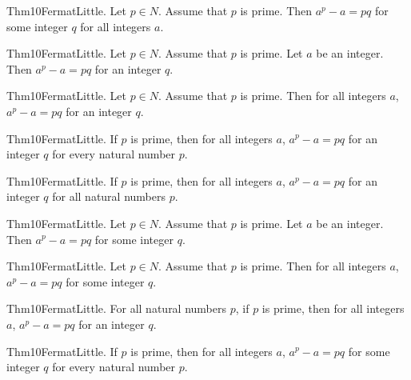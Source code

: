 \documentclass{article}
\begin{document}
Thm10FermatLittle. Let $p \in N$. Assume that $p$ is prime. Then $a ^ {p}- a = p q$ for some integer $q$ for all integers $a$.

Thm10FermatLittle. Let $p \in N$. Assume that $p$ is prime. Let $a$ be an integer. Then $a ^ {p}- a = p q$ for an integer $q$.

Thm10FermatLittle. Let $p \in N$. Assume that $p$ is prime. Then for all integers $a$, $a ^ {p}- a = p q$ for an integer $q$.

Thm10FermatLittle. If $p$ is prime, then for all integers $a$, $a ^ {p}- a = p q$ for an integer $q$ for every natural number $p$.

Thm10FermatLittle. If $p$ is prime, then for all integers $a$, $a ^ {p}- a = p q$ for an integer $q$ for all natural numbers $p$.

Thm10FermatLittle. Let $p \in N$. Assume that $p$ is prime. Let $a$ be an integer. Then $a ^ {p}- a = p q$ for some integer $q$.

Thm10FermatLittle. Let $p \in N$. Assume that $p$ is prime. Then for all integers $a$, $a ^ {p}- a = p q$ for some integer $q$.

Thm10FermatLittle. For all natural numbers $p$, if $p$ is prime, then for all integers $a$, $a ^ {p}- a = p q$ for an integer $q$.

Thm10FermatLittle. If $p$ is prime, then for all integers $a$, $a ^ {p}- a = p q$ for some integer $q$ for every natural number $p$.
\end{document}
